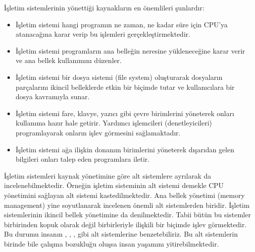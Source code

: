 \documentclass[a4paper,10pt,turkish]{sphinxmanual}
\begin{document}
\sphinxAtStartPar
İşletim sistemlerinin yönettiği kaynakların en önemlileri şunlardır:
\begin{itemize}
\item {} 
\sphinxAtStartPar
{} İşletim sistemi hangi programın ne zaman, ne kadar süre için CPU’ya atanacağına
karar verip bu işlemleri gerçekleştirmektedir.

\item {} 
\sphinxAtStartPar
{} İşletim sistemi programların ana belleğin neresine
yükleneceğine karar verir ve ana bellek kullanımını düzenler.

\item {} 
\sphinxAtStartPar
{} İşletim sistemi bir dosya sistemi (file system) oluşturarak
dosyaların parçalarını ikincil belleklerde etkin bir biçimde tutar ve kullanıcılara bir
dosya kavramıyla sunar.

\item {} 
\sphinxAtStartPar
{} İşletim sistemi fare, klavye, yazıcı
gibi çevre birimlerini yöneterek onları kullanıma hazır hale getirir. Yardımcı
işlemcileri (denetleyicileri) programlayarak onların işlev görmesini sağlamaktadır.

\item {} 
\sphinxAtStartPar
{} İşletim sistemi ağa ilişkin donanım birimlerini yöneterek dışarıdan
gelen bilgileri onları talep eden programlara iletir.

\end{itemize}

\sphinxAtStartPar
İşletim sistemleri kaynak yönetimine göre alt sistemlere ayrılarak da incelenebilmektedir.
Örneğin işletim sisteminin  alt sistemi demekle CPU yönetimini
sağlayan alt sistemi kastedilmektedir. Ana bellek yönetimi (memory management) yine
soyutlanarak incelenen önemli alt sistemlerden biridir. İşletim sistemlerinin ikincil bellek
yönetimine  da denilmektedir. Tabii bütün bu sistemler
birbirinden kopuk olarak değil birbirleriyle ilişkili bir biçimde işlev görmektedir. Bu
durumu insanın , , , 
gibi alt sistemlerine benzetebiliriz. Bu alt sistemlerin birinde bile çalışma bozukluğu
oluşsa insan yaşamını yitirebilmektedir.
\end{document}
